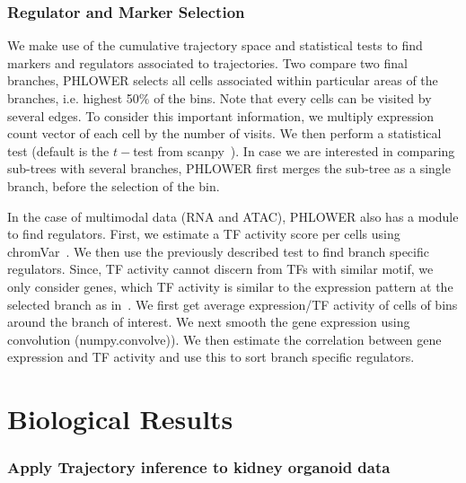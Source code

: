 \subsubsection{Regulator and Marker Selection}
We make use of the cumulative trajectory space and statistical tests to find markers and regulators associated to trajectories. Two compare two final branches, PHLOWER selects all cells associated within particular areas of the branches, i.e. highest \num{50}$\%$ of the bins. Note that every cells can be visited by several edges. To consider this important information, we multiply expression count vector of each cell by the number of visits. We then perform a statistical test (default is the $t-$test from scanpy~\citep{wolf2018scanpy}). In case we are interested in comparing sub-trees with several branches, PHLOWER first merges the sub-tree as a single branch, before the selection of the bin.

In the case of multimodal data (RNA and ATAC), PHLOWER also has a module to find regulators. First, we estimate a TF activity score per cells using chromVar~\citep{schep2017chromvar}. We then use the previously described test to find branch specific regulators. Since, TF activity cannot discern from TFs with similar motif, we only consider genes, which TF activity is similar to the expression pattern at the selected branch as in~\citep{li2023scmega}. We first get average expression/TF activity of cells of bins around the branch of interest. We next smooth the gene expression using convolution (numpy.convolve)). We then estimate the correlation between gene expression and TF activity and use this to sort branch specific regulators.

\section{Biological Results}
\label{PHLOWER_bench:bio_out}
\subsubsection{Apply Trajectory inference to kidney organoid data}

